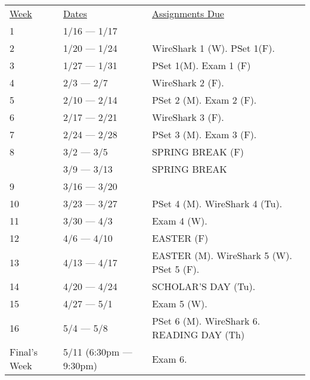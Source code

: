\documentclass[10pt]{article}
\begin{document}
\begin{center}
\begin{tabular}{lll}
\underline{Week} & \underline{Dates} & \underline{Assignments Due}  \\
1 & 1/16 --- 1/17 &  \\
2 & 1/20 --- 1/24 & WireShark 1 (W). PSet 1(F). \\
3 & 1/27 --- 1/31 & PSet 1(M). Exam 1 (F)  \\
4 & 2/3 --- 2/7 & WireShark 2 (F).\\
5 & 2/10 --- 2/14 &  PSet 2 (M). Exam 2 (F). \\
6 & 2/17 --- 2/21 & WireShark 3 (F).  \\
7 & 2/24 --- 2/28 &  PSet 3 (M). Exam 3 (F).   \\
8 & 3/2 --- 3/5 & SPRING BREAK (F) \\
  & 3/9 --- 3/13 &  SPRING BREAK \\
9 & 3/16 --- 3/20 &   \\
10 & 3/23 --- 3/27 & PSet 4 (M). WireShark 4 (Tu).    \\
11 & 3/30 --- 4/3 &  Exam 4 (W).   \\
12 & 4/6 --- 4/10 &  EASTER (F) \\
13 & 4/13 --- 4/17 & EASTER (M). WireShark 5 (W). PSet 5 (F). \\
14 & 4/20 --- 4/24 & SCHOLAR'S DAY (Tu).     \\
15 & 4/27 --- 5/1 & Exam 5 (W).  \\
16 & 5/4 --- 5/8 & PSet 6 (M). WireShark 6. READING DAY (Th)  \\
Final's Week & 5/11 (6:30pm --- 9:30pm) & Exam 6.    \\
\end{tabular}
\end{center}
\end{document}
